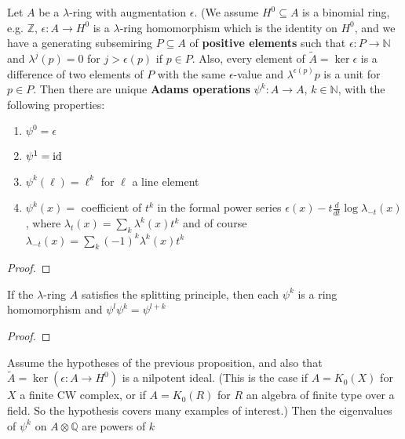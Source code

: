 \documentclass[main]{subfiles}
\begin{document}
\begin{theorem}
Let $A$ be a $\lambda$-ring with augmentation $\epsilon$. (We assume $H^0\subseteq A$ is a binomial ring, e.g. $\mathbb Z$, $\epsilon:A\to H^0$ is a $\lambda$-ring homomorphism which is the identity on $H^0$, and we have a generating subsemiring $P\subseteq A$ of \textbf{positive elements} such that $\epsilon:P\to\mathbb N$ and $\lambda^j(p)=0$ for $j>\epsilon(p)$ if $p\in P$. Also, every element of $\tilde A=\ker\epsilon$ is a difference of two elements of $P$ with the same $\epsilon$-value and $\lambda^{\epsilon(p)}p$ is a unit for $p\in P$. Then there are unique \textbf{Adams operations} $\psi^k:A\to A$, $k\in\mathbb N$, with the following properties:
\begin{enumerate}[label=\alph*)]
\item $\psi^0=\epsilon$
\item $\psi^1=\operatorname{id}$
\item $\psi^k(\ell)=\ell^k$ for $\ell$ a line element
\item $\psi^k(x)=$ coefficient of $t^k$ in the formal power series $\epsilon(x)-t\frac{d}{dt}\log\lambda_{-t}(x)$, where $\lambda_t(x)=\sum_{k}\lambda^k(x)t^k$ and of course $\lambda_{-t}(x)=\sum_k(-1)^k\lambda^k(x)t^k$
\end{enumerate}
\end{theorem}

\begin{proof}

\end{proof}

\begin{proposition}
If the $\lambda$-ring $A$ satisfies the splitting principle, then each $\psi^k$ is a ring homomorphism and $\psi^l\psi^k=\psi^{l+k}$
\end{proposition}

\begin{proof}

\end{proof}

\begin{proposition}
Assume the hypotheses of the previous proposition, and also that $\tilde A=\ker(\epsilon:A\to H^0)$ is a nilpotent ideal. (This is the case if $A=K_0(X)$ for $X$ a finite CW complex, or if $A=K_0(R)$ for $R$ an algebra of finite type over a field. So the hypothesis covers many examples of interest.) Then the eigenvalues of $\psi^k$ on $A\otimes \mathbb Q$ are powers of $k$
\end{proposition}
\end{document}
